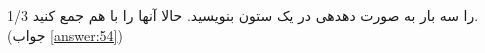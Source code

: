 \section{}
\paragraph{}\label{hint:302}
1/3 را سه بار به صورت دهدهی در یک ستون بنویسید. حالا آنها را با هم جمع کنید. (جواب \ref{answer:54})